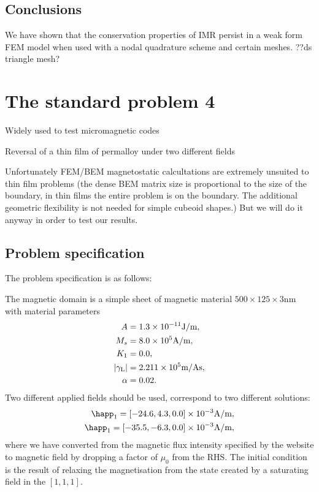 \subsection{Conclusions}

We have shown that the conservation properties of IMR persist in a weak form FEM model when used with a nodal quadrature scheme and certain meshes.
??ds triangle mesh?



\section{The \mumag standard problem 4}

Widely used to test micromagnetic codes

Reversal of a thin film of permalloy under two different fields

Unfortunately FEM/BEM magnetostatic calcultations are extremely unsuited to thin film problems (the dense BEM matrix size is proportional to the size of the boundary, in thin films the entire problem is on the boundary. The additional geometric flexibility is not needed for simple cubeoid shapes.)
But we will do it anyway in order to test our results.


\subsection{Problem specification}

The problem specification is as follows:

The magnetic domain is a simple sheet of magnetic material $500 \times 125 \times 3$nm with material parameters
\begin{equation}
  \begin{aligned}
    A &= 1.3\times 10^{-11} \text{J/m}, \\
    M_s &= 8.0\times 10^{5} \text{A/m}, \\
    K_1 &= 0.0, \\
    {\left|{\gamma_{\mathrm{\tiny{L}}}} \right|} &= 2.211 \times 10^{5} \text{m/As}, \\
    \alpha &= 0.02.
  \end{aligned}
\end{equation}
Two different applied fields should be used, correspond to two different solutions:
\begin{equation}
  \begin{aligned}
    \happ_1 = [-24.6, 4.3, 0.0] \E{-3}\text{A/m}, \\
    \happ_1 = [-35.5, -6.3, 0.0] \E{-3}\text{A/m}, \\
  \end{aligned}
  \label{eq:mumag-h-app}
\end{equation}
where we have converted from the magnetic flux intensity specified by the \mumag website to magnetic field by dropping a factor of $\mu_0$ from the RHS.
The initial condition is the result of relaxing the magnetisation from the state created by a saturating field in the $[1,1,1]$.

